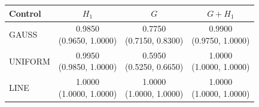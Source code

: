 \begin{tabular}{lccc}
\toprule
Control & $H_1$ & $G$ & $G+H_1$ \\
\midrule
GAUSS & \shortstack{0.9850\\(0.9650, 1.0000)} & \shortstack{0.7750\\(0.7150, 0.8300)} & \shortstack{0.9900\\(0.9750, 1.0000)} \\[3pt]
UNIFORM & \shortstack{0.9950\\(0.9850, 1.0000)} & \shortstack{0.5950\\(0.5250, 0.6650)} & \shortstack{1.0000\\(1.0000, 1.0000)} \\[3pt]
LINE & \shortstack{1.0000\\(1.0000, 1.0000)} & \shortstack{1.0000\\(1.0000, 1.0000)} & \shortstack{1.0000\\(1.0000, 1.0000)} \\[3pt]
\bottomrule
\end{tabular}
